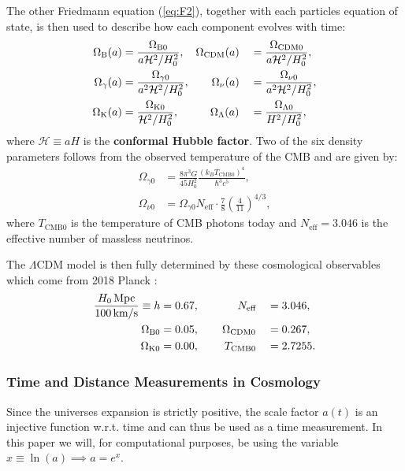 \documentclass[%
reprint,
 amsmath,amssymb,
 aps,
]{revtex4-2}
\newcommand{\Hp}{\mathcal{H}}
\begin{document}
The other Friedmann equation (\ref{eq:F2}), together with each particles equation of state, is then used to describe how each component evolves with time:
\begin{alignat}{2}
	\Omega_{\text B}(a)&=\frac{\Omega_{\text B0}}{a\Hp^2/H_0^2},\hspace{3.5mm}\Omega_{\text{CDM}}(a)&&=\frac{\Omega_{\text{CDM}0}}{a\Hp^2/H_0^2},\nonumber\\
	\Omega_{\gamma}(a)&=\frac{\Omega_{\gamma0}}{a^2\Hp^2/H_0^2},\hspace{7mm}\Omega_{\nu}(a)&&=\frac{\Omega_{\nu0}}{a^2\Hp^2/H_0^2},\label{eq:Omegai}\\
	\Omega_{\text K}(a)&=\frac{\Omega_{\text K0}}{\Hp^2/H_0^2},\hspace{10mm}\Omega_{\Lambda}(a)&&=\frac{\Omega_{\Lambda0}}{H^2/H_0^2},\nonumber
\end{alignat}
where $\Hp\equiv aH$ is the \textbf{conformal Hubble factor}. 
Two of the six density parameters follows from the observed temperature of the CMB and are given by:
\begin{align}
	\label{eq:ORad}
	\Omega_{\gamma0}&=\frac{8\pi^3 G}{45 H_0^2}\frac{(k_BT_{\text{CMB}0})^4}{\hbar^3 c^5},\\
	\label{eq:ONu}
	\Omega_{\nu0}&=\Omega_{\gamma0}N_{\text{eff}}\cdot\frac{7}{8}\left(\frac{4}{11}\right)^{4/3},
\end{align}
where $T_{\text{CMB}0}$ is the temperature of CMB photons today and $N_{\text{eff}}=3.046$ is the effective number of massless neutrinos. 

The $\Lambda$CDM model is then fully determined by these cosmological observables which come from 2018 Planck \cite{Planck:2018vyg}:
\begin{alignat}{2}
	\frac{H_0\,\text{Mpc}}{100\,\text{km/s}}\equiv h &= 0.67,\hspace{12.2mm}N_\text{eff}&&=3.046,\nonumber\\
	\Omega_{\text B0}&=0.05,\hspace{7.3mm}\Omega_{\text{CDM}0}&&=0.267,\label{eq:planck_data}\\
	\Omega_{\text K0}&=0.00,\hspace{8mm}T_{\text{CMB}0}&&=2.7255.\nonumber
\end{alignat}
\subsubsection{Time and Distance Measurements in Cosmology}
Since the universes expansion is strictly positive, the scale factor $a(t)$ is an injective function w.r.t. time and can thus be used as a time measurement. In this paper we will, for computational purposes, be using the variable $x\equiv\ln(a)\implies a=e^x$. 
\end{document}
